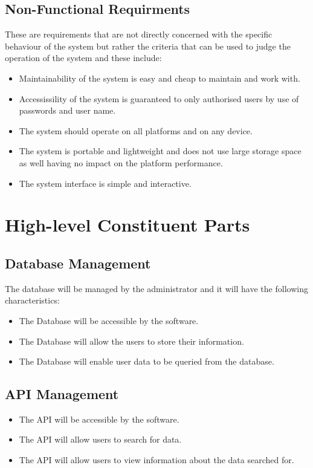 \documentclass[twoside, a4paper, 12pt]{report}
\begin{document}
\subsection{Non-Functional Requirments}
These are requirements that are not directly concerned with the specific behaviour of the system but rather the criteria that can be used to judge the operation of the system and these include:
\begin{itemize}
	\item Maintainability of the system is easy and cheap to maintain and work with.
	\item Accessissility of the system is guaranteed to only authorised users by use of passwords and user name.
	\item The system should operate on all platforms and on any device.
	\item The system is portable and lightweight and does not use large storage space as well having no impact on the platform performance.
	\item The system interface is simple and interactive.
\end{itemize}

\section{High-level Constituent Parts}
\subsection{Database Management}
The database will be managed by the administrator and it will have the following characteristics:
\begin{itemize}
	\item The Database will be accessible by the software.
	\item The Database will allow the users to store their information.
	\item The Database will enable user data to be queried from the database.
\end{itemize}

\subsection{API Management}
\begin{itemize}
	\item The API will be accessible by the software.
	\item The API will allow users to search for data.
	\item The API will allow users to view information about the data searched for.
\end{itemize}
\end{document}
